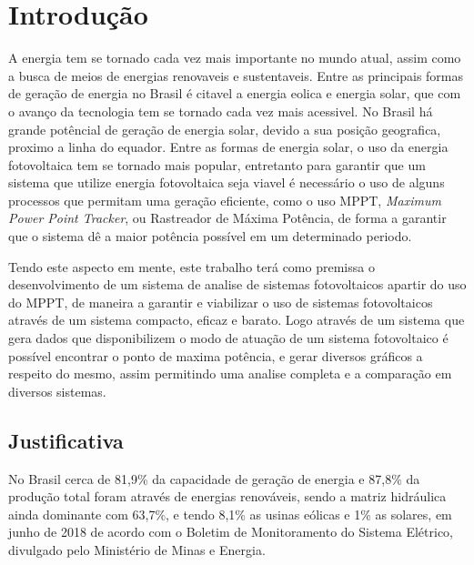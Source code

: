 \chapter{Introdução}
\label{cap:01}
A energia tem se tornado cada vez mais importante no mundo atual, assim como a busca de meios de energias renovaveis e sustentaveis. Entre as principais formas de geração de energia no Brasil é citavel a energia eolica e energia solar, que com o avanço da tecnologia tem se tornado cada vez mais acessivel. No Brasil há grande potêncial de geração de energia solar, devido a sua posição geografica, proximo a linha do equador. Entre as formas de energia solar, o uso da energia fotovoltaica tem se tornado mais popular, entretanto para garantir que um sistema que utilize energia fotovoltaica seja viavel é necessário o uso de alguns processos que permitam uma geração eficiente, como o uso MPPT, \textit{Maximum Power Point Tracker}, ou Rastreador de Máxima Potência, de forma a garantir que o sistema dê a maior potência possível em um determinado periodo.

\indent		Tendo este aspecto em mente, este trabalho terá como premissa o desenvolvimento de um sistema de analise de sistemas fotovoltaicos apartir do uso do MPPT, de maneira a garantir e viabilizar o uso de sistemas fotovoltaicos através de um sistema compacto, eficaz e barato.
Logo através de um sistema que gera dados que disponibilizem o modo de atuação de um sistema fotovoltaico é possível encontrar o ponto de maxima potência, e gerar diversos gráficos a respeito do mesmo, assim permitindo uma analise completa e a comparação em diversos sistemas.


\section{Justificativa}

No Brasil cerca de 81,9\% da capacidade de geração de energia e 87,8\% da produção total foram através de energias renováveis, sendo a matriz hidráulica ainda dominante com 63,7\%, e tendo 8,1\% as usinas eólicas e 1\% as solares, em junho de 2018 de acordo com o Boletim de Monitoramento do Sistema Elétrico, divulgado pelo Ministério de Minas e Energia.

